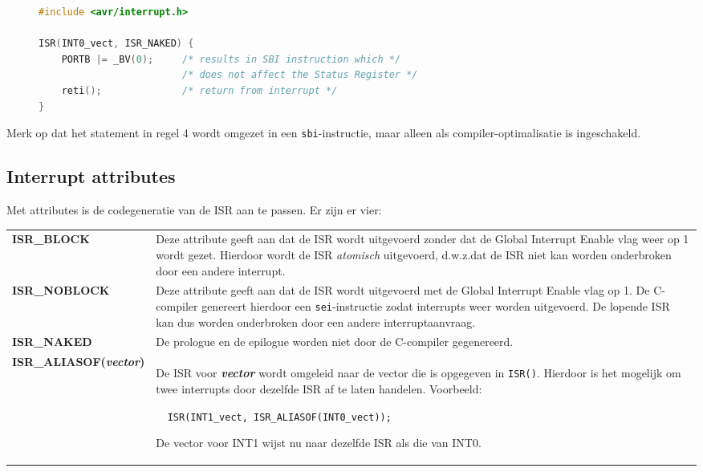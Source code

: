 \begin{figure}[!ht]
\begin{lstlisting}[language=C,caption=Een naked interrupt voor INT0.,label=cod:intnakedisr]
#include <avr/interrupt.h>

ISR(INT0_vect, ISR_NAKED) {
	PORTB |= _BV(0);     /* results in SBI instruction which */
	                     /* does not affect the Status Register */
	reti();              /* return from interrupt */
}
\end{lstlisting}
\end{figure}

Merk op dat het statement in regel 4 wordt omgezet in een
\lstinline|sbi|-instructie, maar alleen als compiler-optimalisatie
is ingeschakeld.

\subsection{Interrupt attributes}
Met attributes is de codegeneratie van de ISR aan te passen. Er zijn er vier:

\begin{center}
\renewcommand*{\arraystretch}{1.5}
\begin{tabular}{lp{10.5cm}}
\textbf{ISR\_BLOCK} & Deze attribute geeft aan dat de ISR wordt uitgevoerd zonder dat de Global Interrupt Enable vlag weer op 1 wordt gezet. Hierdoor wordt de ISR \textsl{atomisch} uitgevoerd, d.w.z.\@ dat de ISR niet kan worden onderbroken door een andere interrupt.\\
\textbf{ISR\_NOBLOCK} & Deze attribute geeft aan dat de ISR wordt uitgevoerd met de Global Interrupt Enable vlag op 1. De C-compiler genereert hierdoor een \lstinline|sei|-instructie zodat interrupts weer worden uitgevoerd. De lopende ISR kan dus worden onderbroken door een andere interruptaanvraag.\\
\textbf{ISR\_NAKED} & De prologue en de epilogue worden niet door de C-compiler gegenereerd.\\
\textbf{ISR\_ALIASOF(\textsl{vector})} & De ISR voor \textbf{\textsl{vector}} wordt omgeleid naar de vector die is opgegeven in \lstinline|ISR()|. Hierdoor is het mogelijk om twee interrupts door dezelfde ISR af te laten handelen. Voorbeeld:\newline

\lstinline|  ISR(INT1_vect, ISR_ALIASOF(INT0_vect));|\newline

De vector voor INT1 wijst nu naar dezelfde ISR als die van INT0.\\
\end{tabular}
\end{center}

